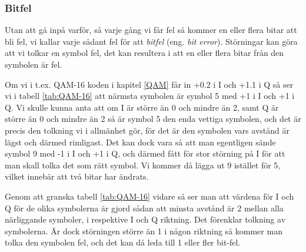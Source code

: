 \subsubsection{Bitfel}
\begin{rev-nytt}[MAD]

Utan att gå inpå varför, så varje gång vi får fel så kommer en eller flera
bitar att bli fel, vi kallar varje sådant fel för att \emph{bitfel} (eng.
\emph{bit error}). Störningar kan göra att vi tolkar en symbol fel, det kan
resultera i att en eller flera bitar från den symbolen är fel.

Om vi i t.ex. QAM-16 koden i kapitel \ref{QAM} får in +0.2 i I och +1.1 i Q
så ser vi i tabell \ref{tab:QAM-16} att närmsta symbolen är symbol 5 med +1 i I
och +1 i Q. Vi skulle kunna anta att om I är större än 0 och mindre än 2, samt
Q är större än 0 och mindre än 2 så är symbol 5 den enda vettiga symbolen, och
det är precis den tolkning vi i allmänhet gör, för det är den symbolen vars
avstånd är lägst och därmed rimligast. Det kan dock vara så att man egentligen
sände symbol 9 med -1 i I och +1 i Q, och därmed fått för stor störning på I
för att man skall tolka det som rätt symbol. Vi kommer då lägga ut 9 istället
för 5, vilket innebär att två bitar har ändrats.

Genom att granska tabell \ref{tab:QAM-16} vidare så ser man att värdena för
I och Q för de olika symbolerna är gjord sådan att minsta avstånd är 2 mellan
alla närliggande symboler, i respektive I och Q riktning. Det förenklar
tolkning av symbolerna. Är dock störningen större än 1 i någon riktning så
kommer man tolka den symbolen fel, och det kan då leda till 1 eller fler
bit-fel.

\end{rev-nytt}

